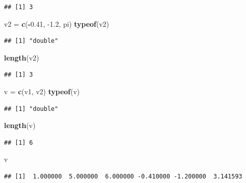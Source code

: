 \documentclass[
]{book}
\newenvironment{Shaded}{\begin{snugshade}}{\end{snugshade}}
\newcommand{\FloatTok}[1]{\textcolor[rgb]{0.00,0.00,0.81}{#1}}
\newcommand{\KeywordTok}[1]{\textcolor[rgb]{0.13,0.29,0.53}{\textbf{#1}}}
\newcommand{\NormalTok}[1]{#1}
\newcommand{\OperatorTok}[1]{\textcolor[rgb]{0.81,0.36,0.00}{\textbf{#1}}}
\newcommand{\StringTok}[1]{\textcolor[rgb]{0.31,0.60,0.02}{#1}}
\begin{document}
\begin{verbatim}
## [1] 3
\end{verbatim}

\begin{Shaded}
\begin{Highlighting}[]
\NormalTok{v2 =}\StringTok{ }\KeywordTok{c}\NormalTok{(}\OperatorTok{-}\FloatTok{0.41}\NormalTok{, }\FloatTok{-1.2}\NormalTok{, pi)}
\KeywordTok{typeof}\NormalTok{(v2)}
\end{Highlighting}
\end{Shaded}

\begin{verbatim}
## [1] "double"
\end{verbatim}

\begin{Shaded}
\begin{Highlighting}[]
\KeywordTok{length}\NormalTok{(v2)}
\end{Highlighting}
\end{Shaded}

\begin{verbatim}
## [1] 3
\end{verbatim}

\begin{Shaded}
\begin{Highlighting}[]
\NormalTok{v =}\StringTok{ }\KeywordTok{c}\NormalTok{(v1, v2)}
\KeywordTok{typeof}\NormalTok{(v)}
\end{Highlighting}
\end{Shaded}

\begin{verbatim}
## [1] "double"
\end{verbatim}

\begin{Shaded}
\begin{Highlighting}[]
\KeywordTok{length}\NormalTok{(v)}
\end{Highlighting}
\end{Shaded}

\begin{verbatim}
## [1] 6
\end{verbatim}

\begin{Shaded}
\begin{Highlighting}[]
\NormalTok{v}
\end{Highlighting}
\end{Shaded}

\begin{verbatim}
## [1]  1.000000  5.000000  6.000000 -0.410000 -1.200000  3.141593
\end{verbatim}
\end{document}
